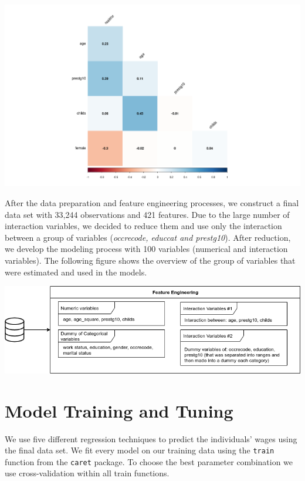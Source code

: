 \documentclass[11pt,a4paper]{article}
\let\origfigure\figure
\let\endorigfigure\endfigure
\renewenvironment{figure}[1][2] {
    \expandafter\origfigure\expandafter[H]
} {
    \endorigfigure
}
\begin{document}
\begin{figure}
\centering
\includegraphics{includes/corr_matrix.png}
\caption{Correlation Matrix}
\end{figure}

After the data preparation and feature engineering processes, we
construct a final data set with 33,244 observations and 421 features.
Due to the large number of interaction variables, we decided to reduce
them and use only the interaction between a group of variables
(\emph{occrecode, educcat and prestg10}). After reduction, we develop
the modeling process with 100 variables (numerical and interaction
variables). The following figure shows the overview of the group of
variables that were estimated and used in the models.

\begin{figure}
\centering
\includegraphics{includes/feature_process.png}
\caption{Feature Engineering}
\end{figure}

\hypertarget{model-training-and-tuning}{%
\section{Model Training and Tuning}\label{model-training-and-tuning}}

We use five different regression techniques to predict the individuals'
wages using the final data set. We fit every model on our training data
using the \texttt{train} function from the \texttt{caret} package. To
choose the best parameter combination we use cross-validation within all
train functions.
\end{document}

